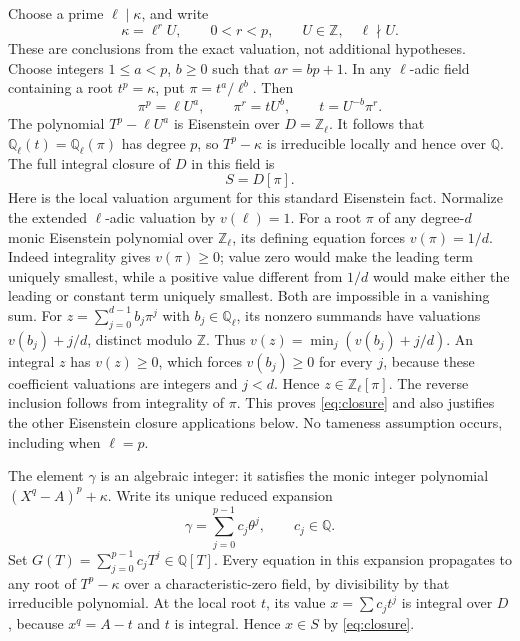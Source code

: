 \documentclass[11pt,letterpaper]{article}
\theoremstyle{remark}\newtheorem{remark}[theorem]{Remark}
\newcommand{\Q}{\mathbb Q}
\newcommand{\Z}{\mathbb Z}
\begin{document}
Choose a prime $\ell\mid\kappa$, and write
\[
       \kappa=\ell^r U,\qquad 0<r<p,\qquad U\in\Z,\quad\ell\nmid U.
\]
These are conclusions from the exact valuation, not additional hypotheses.
Choose integers $1\le a<p$, $b\ge0$ such that $ar=bp+1$. In any
$\ell$-adic field containing a root $t^p=\kappa$, put $\pi=t^a/\ell^b$.
Then
\begin{equation}\label{eq:normalization}
             \pi^p=\ell U^a,\qquad \pi^r=tU^b,
                         \qquad t=U^{-b}\pi^r.
\end{equation}
The polynomial $T^p-\ell U^a$ is Eisenstein over $D=\Z_\ell$.
It follows that $\Q_\ell(t)=\Q_\ell(\pi)$ has degree $p$, so
$T^p-\kappa$ is irreducible locally and hence over $\Q$.
The full integral closure of $D$ in this field is
\begin{equation}\label{eq:closure}
                              S=D[\pi].
\end{equation}
Here is the local valuation argument for this standard Eisenstein fact.
Normalize the extended $\ell$-adic valuation by $v(\ell)=1$.
For a root $\pi$ of any degree-$d$ monic Eisenstein polynomial over
$\Z_\ell$, its defining equation forces $v(\pi)=1/d$.
Indeed integrality gives $v(\pi)\ge0$; value zero would make the leading
term uniquely smallest, while a positive value different from $1/d$ would
make either the leading or constant term uniquely smallest. Both are
impossible in a vanishing sum.
For $z=\sum_{j=0}^{d-1}b_j\pi^j$ with $b_j\in\Q_\ell$, its nonzero
summands have valuations $v(b_j)+j/d$, distinct modulo $\Z$. Thus
$v(z)=\min_j(v(b_j)+j/d)$. An integral $z$ has $v(z)\ge0$, which forces
$v(b_j)\ge0$ for every $j$, because these coefficient valuations are
integers and $j<d$. Hence $z\in\Z_\ell[\pi]$. The reverse inclusion
follows from integrality of $\pi$. This proves \eqref{eq:closure} and
also justifies the other Eisenstein closure applications below.
No tameness assumption occurs, including when $\ell=p$.

The element $\gamma$ is an algebraic integer: it satisfies the monic
integer polynomial $(X^q-A)^p+\kappa$. Write its unique reduced expansion
\begin{equation}\label{eq:coords}
                   \gamma=\sum_{j=0}^{p-1}c_j\theta^j,
                              \qquad c_j\in\Q.
\end{equation}
Set $G(T)=\sum_{j=0}^{p-1}c_jT^j\in\Q[T]$.
Every equation in this expansion propagates to any root of $T^p-\kappa$
over a characteristic-zero field, by divisibility by that irreducible
polynomial. At the local root $t$, its value $x=\sum c_jt^j$ is integral
over $D$, because $x^q=A-t$ and $t$ is integral. Hence $x\in S$ by
\eqref{eq:closure}.
\end{document}
